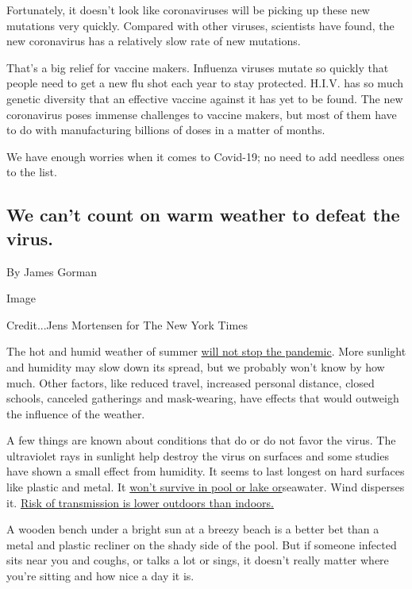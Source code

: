 Fortunately, it doesn't look like coronaviruses will be picking up these
new mutations very quickly. Compared with other viruses, scientists have
found, the new coronavirus has a relatively slow rate of new mutations.

That's a big relief for vaccine makers. Influenza viruses mutate so
quickly that people need to get a new flu shot each year to stay
protected. H.I.V. has so much genetic diversity that an effective
vaccine against it has yet to be found. The new coronavirus poses
immense challenges to vaccine makers, but most of them have to do with
manufacturing billions of doses in a matter of months.

We have enough worries when it comes to Covid-19; no need to add
needless ones to the list.

\hypertarget{we-cant-count-on-warm-weather-to-defeat-the-virus}{%
\subsection{We can't count on warm weather to defeat the
virus.}\label{we-cant-count-on-warm-weather-to-defeat-the-virus}}

By James Gorman

Image

Credit...Jens Mortensen for The New York Times

The hot and humid weather of summer
\href{https://www.nytimes3xbfgragh.onion/2020/05/08/health/virus-summer-pandemic.html}{will
not stop the pandemic}. More sunlight and humidity may slow down its
spread, but we probably won't know by how much. Other factors, like
reduced travel, increased personal distance, closed schools, canceled
gatherings and mask-wearing, have effects that would outweigh the
influence of the weather.

A few things are known about conditions that do or do not favor the
virus. The ultraviolet rays in sunlight help destroy the virus on
surfaces and some studies have shown a small effect from humidity. It
seems to last longest on hard surfaces like plastic and metal. It
\href{https://www.nytimes3xbfgragh.onion/2020/05/15/us/coronavirus-what-to-do-outside.html}{won't
survive in pool or lake or}seawater. Wind disperses it.
\href{https://www.nytimes3xbfgragh.onion/2020/05/15/us/coronavirus-what-to-do-outside.html}{Risk
of transmission is lower outdoors than indoors.}

A wooden bench under a bright sun at a breezy beach is a better bet than
a metal and plastic recliner on the shady side of the pool. But if
someone infected sits near you and coughs, or talks a lot or sings, it
doesn't really matter where you're sitting and how nice a day it is.

